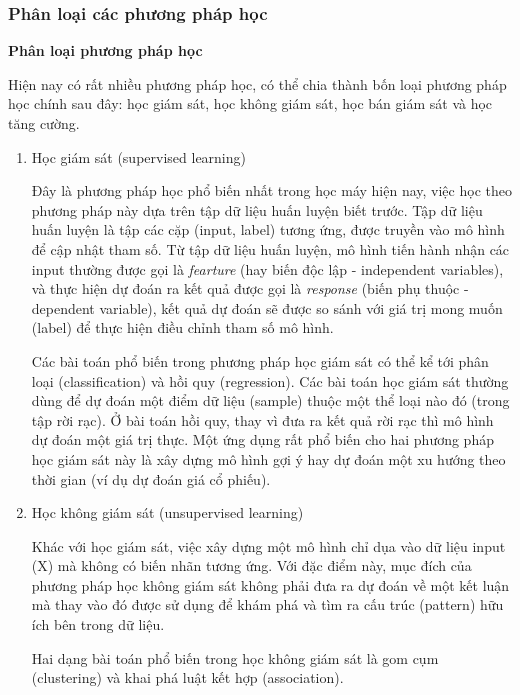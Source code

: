 
\subsubsection{Phân loại các phương pháp học}
\textbf{Phân loại phương pháp học}

Hiện nay có rất nhiều phương pháp học, có thể chia thành bốn loại phương pháp học chính sau đây: học giám sát, học không giám sát, học bán giám sát và học tăng cường.

\begin{enumerate}
    \item Học giám sát (supervised learning)

          Đây là phương pháp học phổ biến nhất trong học máy hiện nay, việc học theo phương pháp này dựa trên tập dữ liệu huấn luyện biết trước. Tập dữ liệu huấn luyện là tập các cặp (input, label) tương ứng, được truyền vào mô hình để cập nhật tham số. Từ tập dữ liệu huấn luyện, mô hình tiến hành nhận các input thường được gọi là \textit{fearture} (hay biến độc lập - independent variables), và thực hiện dự đoán ra kết quả được gọi là \textit{response} (biến phụ thuộc - dependent variable), kết quả dự đoán sẽ được so sánh với giá trị mong muốn (label) để thực hiện điều chỉnh tham số mô hình.

          Các bài toán phổ biến trong phương pháp học giám sát có thể kể tới phân loại (classification) và hồi quy (regression). Các bài toán học giám sát thường dùng để dự đoán một điểm dữ liệu (sample) thuộc một thể loại nào đó (trong tập rời rạc). Ở bài toán hồi quy, thay vì đưa ra kết quả rời rạc thì mô hình dự đoán một giá trị thực. Một ứng dụng rất phổ biến cho hai phương pháp học giám sát này là xây dựng mô hình gợi ý hay dự đoán một xu hướng theo thời gian (ví dụ dự đoán giá cổ phiếu).

    \item Học không giám sát (unsupervised learning)

          Khác với học giám sát, việc xây dựng một mô hình chỉ dụa vào dữ liệu input (X) mà không có biến nhãn tương ứng. Với đặc điểm này, mục đích của phương pháp học không giám sát không phải đưa ra dự đoán về một kết luận mà thay vào đó được sử dụng để khám phá và tìm ra cấu trúc (pattern) hữu ích bên trong dữ liệu.

          Hai dạng bài toán phổ biến trong học không giám sát là gom cụm (clustering) và khai phá luật kết hợp (association).


\end{enumerate}
